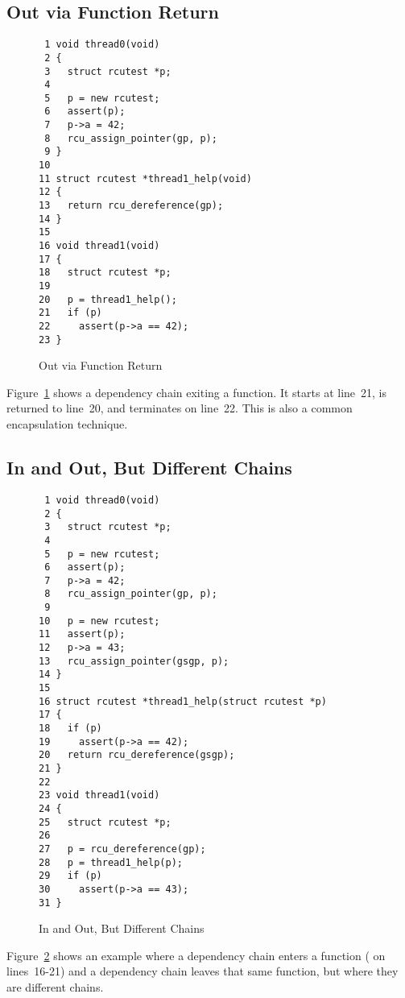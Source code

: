 \documentclass[letterpaper,10pt]{article}
\begin{document}
\subsection{Out via Function Return}
\label{sec:Out via Function Return}

\begin{figure}[tbp]
{ \scriptsize
\begin{verbatim}
 1 void thread0(void)
 2 {
 3   struct rcutest *p;
 4
 5   p = new rcutest;
 6   assert(p);
 7   p->a = 42;
 8   rcu_assign_pointer(gp, p);
 9 }
10
11 struct rcutest *thread1_help(void)
12 {
13   return rcu_dereference(gp);
14 }
15
16 void thread1(void)
17 {
18   struct rcutest *p;
19
20   p = thread1_help();
21   if (p)
22     assert(p->a == 42);
23 }
\end{verbatim}
}
\caption{Out via Function Return}
\label{fig:Out via Function Return}
\end{figure}

Figure~\ref{fig:Out via Function Return}
shows a dependency chain exiting a function.
It starts at line~21, is returned to line~20, and
terminates on line~22.
This is also a common encapsulation technique.

\subsection{In and Out, But Different Chains}
\label{sec:In and Out, But Different Chains}

\begin{figure}[tbp]
{ \scriptsize
\begin{verbatim}
 1 void thread0(void)
 2 {
 3   struct rcutest *p;
 4
 5   p = new rcutest;
 6   assert(p);
 7   p->a = 42;
 8   rcu_assign_pointer(gp, p);
 9
10   p = new rcutest;
11   assert(p);
12   p->a = 43;
13   rcu_assign_pointer(gsgp, p);
14 }
15
16 struct rcutest *thread1_help(struct rcutest *p)
17 {
18   if (p)
19     assert(p->a == 42);
20   return rcu_dereference(gsgp);
21 }
22
23 void thread1(void)
24 {
25   struct rcutest *p;
26
27   p = rcu_dereference(gp);
28   p = thread1_help(p);
29   if (p)
30     assert(p->a == 43);
31 }
\end{verbatim}
}
\caption{In and Out, But Different Chains}
\label{fig:In and Out, But Different Chains}
\end{figure}

Figure~\ref{fig:In and Out, But Different Chains}
shows an example where a dependency chain enters a function
( on lines~16-21)
and a dependency chain leaves that same function,
but where they are different chains.
\end{document}
